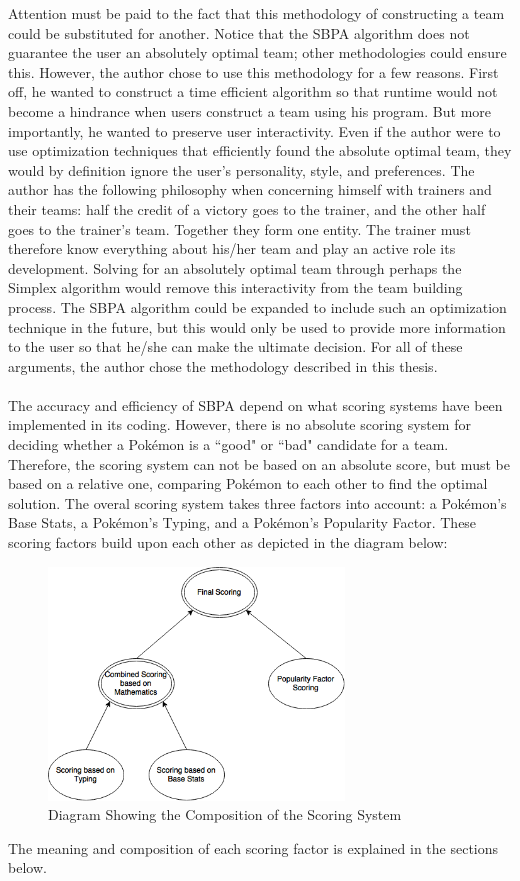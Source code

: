 \documentclass{article}
\begin{document}
Attention must be paid to the fact that this methodology of constructing a team could be substituted for another. Notice that the SBPA algorithm does not guarantee the user an absolutely optimal team; other methodologies could ensure this. However, the author chose to use this methodology for a few reasons. First off, he wanted to construct a time efficient algorithm so that runtime would not become a hindrance when users construct a team using his program. But more importantly, he wanted to preserve user interactivity. Even if the author were to use optimization techniques that efficiently found the absolute optimal team, they would by definition ignore the user's personality, style, and preferences. The author has the following philosophy when concerning himself with trainers and their teams: half the credit of a victory goes to the trainer, and the other half goes to the trainer's team. Together they form one entity. The trainer must therefore know everything about his/her team and play an active role its development. Solving for an absolutely optimal team through perhaps the Simplex algorithm would remove this interactivity from the team building process. The SBPA algorithm could be expanded to include such an optimization technique in the future, but this would only be used to provide more information to the user so that he/she can make the ultimate decision. For all of these arguments, the author chose the methodology described in this thesis.\\\\
The accuracy and efficiency of SBPA depend on what scoring systems have been implemented in its coding. However, there is no absolute scoring system for deciding whether a Pok\'emon is a ``good" or ``bad" candidate for a team. Therefore, the scoring system can not be based on an absolute score, but must be based on a relative one, comparing Pok\'emon to each other to find the optimal solution. The overal scoring system takes three factors into account: a Pok\'emon's Base Stats, a Pok\'emon's Typing, and a Pok\'emon's Popularity Factor. These scoring factors build upon each other as depicted in the diagram below:
\begin{figure}[H]
	\includegraphics[width=0.7\textwidth]{ScoringDiagram.png}
	\centering
	\caption{Diagram Showing the Composition of the Scoring System}\label{ScoringComposition}
\end{figure}
The meaning and composition of each scoring factor is explained in the sections below.
\end{document}
